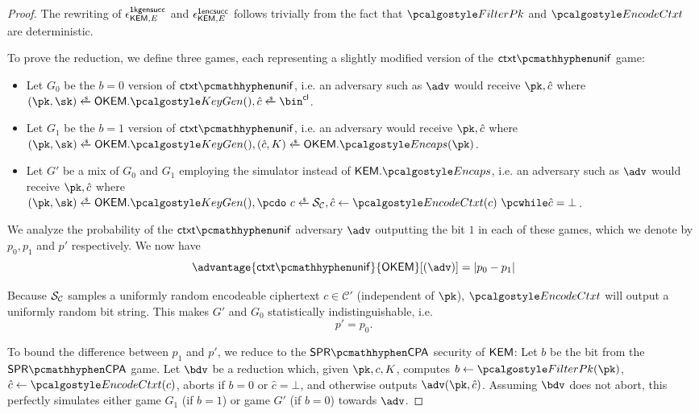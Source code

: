 \begin{proof}
    The rewriting of $\epsilon^{\mathsf{1kgensucc}}_{\mathsf{KEM},E}$ and $\epsilon^{\mathsf{1encsucc}}_{\mathsf{KEM},E}$ follows trivially from the fact that $\filterpk$ and $\encodectxt$ are deterministic.

    To prove the reduction, we define three games, each representing a slightly modified version of the $\ctxtunif$ game:
    \begin{itemize}
        \item Let $G_0$ be the $b=0$ version of $\ctxtunif$, i.e. an adversary such as $\adv$ would receive $\pk, \hat c$ where 
        $(\pk,\sk) \getsr \OKEM.\kgen(), \hat c \getsr \bin^\obfctxtlen$.
        \item Let $G_1$ be the $b=1$ version of $\ctxtunif$, i.e. an adversary would receive $\pk, \hat c$ where\\
        $(\pk,\sk) \getsr \OKEM.\kgen(), (\hat c, K) \getsr \OKEM.\encaps(\pk)$.
        \item Let $G'$ be a mix of $G_0$ and $G_1$ employing the simulator instead of $\KEM.\encaps$, i.e. an adversary such as $\adv$ would receive $\pk, \hat c$ where\\
        $(\pk,\sk) \getsr \OKEM.\kgen(), \pcdo\ c \getsr \simulunif, \hat c \gets \encodectxt(c)\ \pcwhile \hat c = \bot$.
    \end{itemize}

    We analyze the probability of the $\ctxtunif$ adversary $\adv$ outputting the bit $1$ in each of these games, which we denote by $p_0, p_1$ and $p'$ respectively.
    We now have
    \[
        \advantage{\ctxtunif}{\OKEM}[(\adv)] = \left| p_0 - p_1 \right|
    \]

    Because $\mathcal{S}_\mathcal{C}$ samples a uniformly random encodeable ciphertext $c \in \mathcal{C}'$ (independent of $\pk$), $\encodectxt$ will output a uniformly random bit string. This makes $G'$ and $G_0$ statistically indistinguishable, i.e.
    \[ p' = p_0. \]

    To bound the difference between $p_1$ and $p'$, we reduce to the $\sprcpa$ security of $\mathsf{KEM}$:
    Let $b$ be the bit from the $\sprcpa$ game. Let $\bdv$ be a reduction which, given $\pk, c, K$, computes $b \gets \filterpk(\pk)$, $\hat c \gets \encodectxt(c)$, aborts if $b=0$ or $\hat c = \bot$, and otherwise outputs $\adv(\pk, \hat c)$.
    Assuming $\bdv$ does not abort, this perfectly simulates either game $G_1$ (if $b=1$) or game $G'$ (if $b=0$) towards $\adv$.
    

\end{proof}

